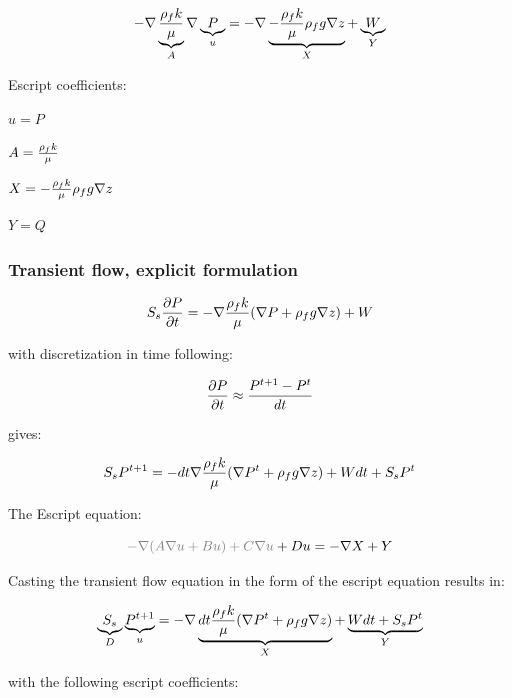 \documentclass[11pt]{article}
\begin{document}
\begin{equation}
	   - \nabla \underbrace{{\rho _{f} k \over{\mu} }}_A \nabla \underbrace{P}_u = - \nabla \underbrace{- {\rho_{f} k \over{\mu} } \rho_f g \nabla z}_X + \underbrace{W}_Y
\end{equation}

Escript coefficients:

$u = P $

$A = {\rho_f k \over{\mu} } $

$X = - {\rho_{f} k \over{\mu} } \rho_f g \nabla z$

$Y = Q $


\subsubsection{Transient flow, explicit formulation}

\begin{equation}
	 S_s { \partial P \over {\partial t} } = - \nabla { \rho_f k \over{\mu} } ( \nabla  P + \rho_f g \nabla z ) + W
\end{equation}

with discretization in time following:

\begin{equation}
    \label{eq:energy_density_explicit}
    {\partial P \over{\partial t} } \approx {P^{t+1} - P^{t} \over{dt} }
\end{equation}

gives:

\begin{equation}
	 S_s P^{t+1} = - dt \nabla { \rho_f k \over{\mu} } ( \nabla  P^{t} + \rho_f g \nabla z) + W dt + S_s P^{t}
\end{equation}

The Escript equation:

\begin{equation}
    {\color{gray} - \nabla (A \nabla u + B u ) + C \nabla u } + D u  = - \nabla X + Y
\end{equation}

Casting the transient flow equation in the form of the escript equation results in:

\begin{equation}
	 \underbrace{S_s}_D \underbrace{P^{t+1}}_u =  - \nabla \underbrace{ dt  {\rho_f k \over{\mu}} ( \nabla  P^{t}  + \rho_f g \nabla z)}_X + \underbrace{W dt + S_s P^{t}}_Y
\end{equation}

with the following escript coefficients:
\end{document}
